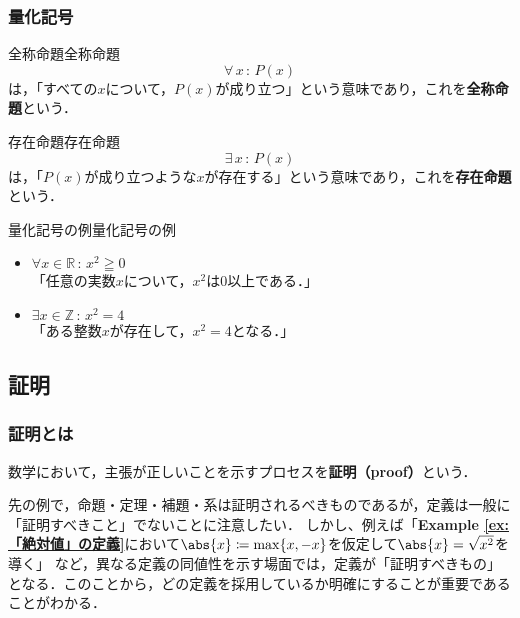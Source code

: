 \documentclass[a4paper,11pt]{ltjsarticle}
\renewcommand{\emph}[1]{\textbf{#1}}
\newcommand{\exref}[1]{{\bfseries\sffamily Example \ref{ex:#1}}}
\renewcommand{\geq}{\geqq}
\begin{document}
    \subsubsection{量化記号}
    
    \begin{definition}{全称命題}{全称命題}
        \[
          \forall\, x \, : \, P(x)
        \]
        は，「すべての$x$について，$P(x)$が成り立つ」という意味であり，これを\emph{全称命題}という．
    \end{definition}
    
    \begin{definition}{存在命題}{存在命題}
        \[
        \exists \,  x\, : \, P(x)
        \]
        は，「$P(x)$が成り立つような$x$が存在する」という意味であり，これを\emph{存在命題}という．
    \end{definition}
    
    \begin{example}{量化記号の例}{量化記号の例}
        \begin{itemize}
            \item $\forall x \in \mathbb{R}\, : \, x^2 \geq 0$\\
            「任意の実数$x$について，$x^2$は$0$以上である．」
            \item $\exists x \in \mathbb{Z} \, : \, x^2 = 4$\\
            「ある整数$x$が存在して，$x^2 = 4$となる．」
        \end{itemize}
    \end{example}

    \subsection{証明}

    \subsubsection{証明とは}
    数学において，主張が正しいことを示すプロセスを\emph{証明（proof）}という．
    
    先の例で，命題・定理・補題・系は証明されるべきものであるが，定義は一般に「証明すべきこと」でないことに注意したい．
    しかし、例えば「\exref{「絶対値」の定義}において$\abs{x} \coloneqq \max \{ x, -x \}$を仮定して$\abs{x} = \sqrt{x^2}$を導く」
    など，異なる定義の同値性を示す場面では，定義が「証明すべきもの」となる．このことから，どの定義を採用しているか明確にすることが重要であることがわかる．
\end{document}
